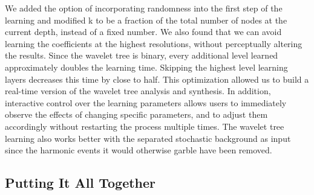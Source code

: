 \documentclass[review]{acmsiggraph}      %
\begin{document}
We added the option of incorporating randomness into the first step of 
the learning and modified k to be a fraction of the total number of 
nodes at the current depth, instead of a fixed number. We also found 
that we can avoid learning the coefficients at the highest resolutions, 
without perceptually altering the results. Since the wavelet tree is binary, every additional 
level learned approximately doubles the learning time. Skipping the highest level learning
layers decreases this time by close to half. 
This optimization allowed us to build a real-time version of the wavelet tree analysis and synthesis. 
In addition, interactive control over the learning parameters allows 
users to immediately observe the effects of changing specific parameters, 
and to adjust them accordingly without restarting the process multiple times. 
The wavelet tree learning also works better with the separated stochastic background 
as input since the harmonic events it would otherwise garble have been removed. 


\subsection{Putting It All Together}
\end{document}
